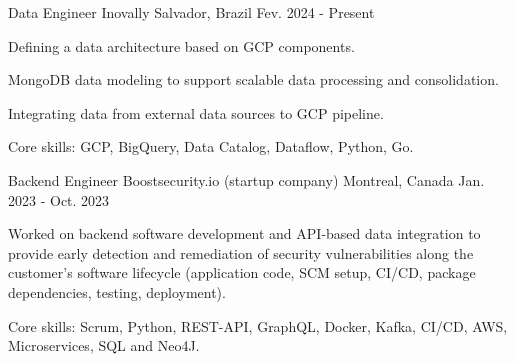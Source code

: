 


\begin{cventries}


\cventry
{Data Engineer} %
{Inovally} %
{Salvador, Brazil} %
{Fev. 2024 - Present} %
{ %
\begin{cvitems}
	\item{Defining a data architecture based on GCP components.}
	\item{MongoDB data modeling to support scalable data processing and consolidation.}
	\item{Integrating data from external data sources to GCP pipeline.}
	\item{Core skills: GCP, BigQuery, Data Catalog, Dataflow, Python, Go.}
\end{cvitems}
}

\cventry
{Backend Engineer} %
{Boostsecurity.io (startup company)} %
{Montreal, Canada} %
{Jan. 2023 - Oct. 2023} %
{ %
\begin{cvitems}
	\item {Worked on backend software development and API-based data integration to provide early detection and remediation of security vulnerabilities along the customer's software lifecycle (application code, SCM setup, CI/CD, package dependencies, testing, deployment).}
	\item{Core skills: Scrum, Python, REST-API, GraphQL, Docker, Kafka, CI/CD, AWS, Microservices, SQL and Neo4J.}
\end{cvitems}
}



\end{cventries}
